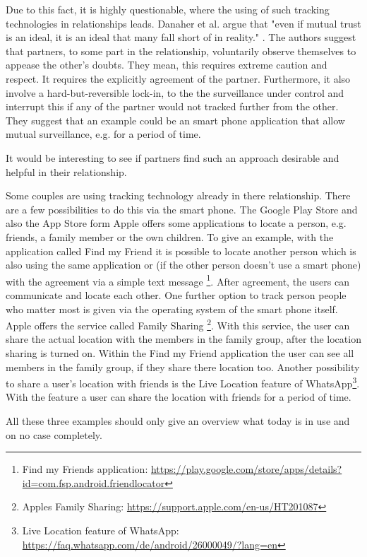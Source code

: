 Due to this fact, it is highly questionable, where the using of such tracking technologies in relationships leads.
Danaher et al. argue that "even if mutual trust is an ideal, it is an ideal that many fall short of in reality." \cite{doi:10.1080/15265161.2017.1409823}.
The authors suggest that partners, to some part in the relationship, voluntarily observe themselves to appease the other's doubts. They mean, this requires extreme caution and respect. It requires the explicitly agreement of the partner. Furthermore, it also involve a hard-but-reversible lock-in, to the the surveillance under control and interrupt this if any of the partner would not tracked further from the other.
They suggest that an example could be an smart phone application that allow mutual surveillance, e.g. for a period of time. 

It would be interesting to see if partners find such an approach desirable and helpful in their relationship. 

Some couples are using tracking technology already in there relationship. %
There are a few possibilities to do this via the smart phone. The Google Play Store and also the App Store form Apple offers some applications to locate a person, e.g. friends, a family member or the own children. To give an example, with the application called Find my Friend it is possible to locate another person which is also using the same application or (if the other person doesn't use a smart phone) with the agreement via a simple text message \footnote{Find my Friends application: \url{https://play.google.com/store/apps/details?id=com.fsp.android.friendlocator}}. After agreement, the users can communicate and locate each other.
One further option to track person people who matter most is given via the operating system of the smart phone itself. Apple offers the service called Family Sharing \footnote{Apples Family Sharing: \url{https://support.apple.com/en-us/HT201087}}. With this service, the user can share the actual location with the members in the family group, after the location sharing is turned on. Within the Find my Friend application the user can see all members in the family group, if they share there location too.
Another possibility to share a user's location with friends is the Live Location feature of WhatsApp\footnote{Live Location feature of WhatsApp: \url{https://faq.whatsapp.com/de/android/26000049/?lang=en}}. With the feature a user can share the location with friends for a period of time.

All these three examples should only give an overview what today is in use and on no case completely.

